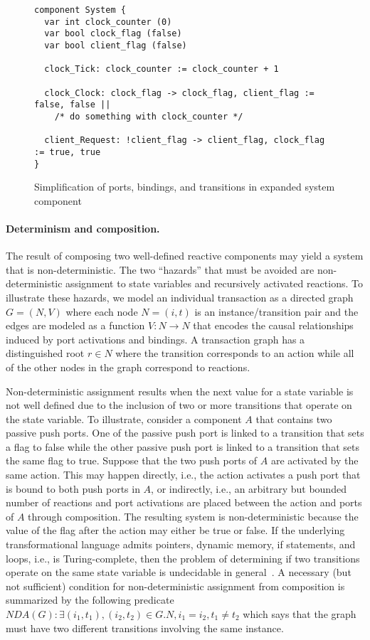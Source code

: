 \begin{figure}
\begin{verbatim}
component System {
  var int clock_counter (0)
  var bool clock_flag (false)
  var bool client_flag (false)

  clock_Tick: clock_counter := clock_counter + 1

  clock_Clock: clock_flag -> clock_flag, client_flag := false, false ||
    /* do something with clock_counter */

  client_Request: !client_flag -> client_flag, clock_flag := true, true
}
\end{verbatim}
\caption{Simplification of ports, bindings, and transitions in expanded system component\label{se2}}
\end{figure}

\paragraph{Determinism and composition.}
The result of composing two well-defined reactive components may yield a system that is non-deterministic.
The two ``hazards'' that must be avoided are non-deterministic assignment to state variables and recursively activated reactions.
To illustrate these hazards, we model an individual transaction as a directed graph $G = (N,V)$ where each node $N=(i,t)$ is an instance/transition pair and the edges are modeled as a function $V: N \to N$ that encodes the causal relationships induced by port activations and bindings.
A transaction graph has a distinguished root $r \in N$ where the transition corresponds to an action while all of the other nodes in the graph correspond to reactions.

Non-deterministic assignment results when the next value for a state variable is not well defined due to the inclusion of two or more transitions that operate on the state variable.
To illustrate, consider a component $A$ that contains two passive push ports.
One of the passive push port is linked to a transition that sets a flag to false while the other passive push port is linked to a transition that sets the same flag to true.
Suppose that the two push ports of $A$ are activated by the same action.
This may happen directly, i.e., the action activates a push port that is bound to both push ports in $A$, or indirectly, i.e., an arbitrary but bounded number of reactions and port activations are placed between the action and ports of $A$ through composition.
The resulting system is non-deterministic because the value of the flag after the action may either be true or false.
If the underlying transformational language admits pointers, dynamic memory, if statements, and loops, i.e., is Turing-complete, then the problem of determining if two transitions operate on the same state variable is undecidable in general~\cite{Landi:1992:USA:161494.161501, Ramalingam:1994:UA:186025.186041}.
A necessary (but not sufficient) condition for non-deterministic assignment from composition is summarized by the following predicate $NDA(G): \exists (i_1, t_1), (i_2, t_2) \in G.N, i_1 = i_2, t_1 \ne t_2$ which says that the graph must have two different transitions involving the same instance.

